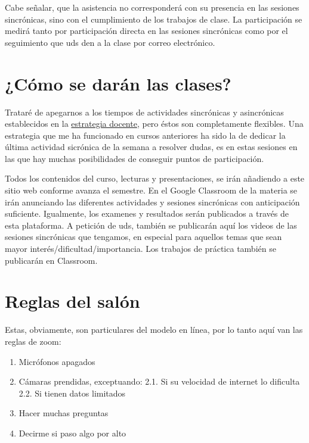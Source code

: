 \documentclass[
]{book}
\providecommand{\tightlist}{%
  \setlength{\itemsep}{0pt}\setlength{\parskip}{0pt}}
\begin{document}
Cabe señalar, que la asistencia no corresponderá con su presencia en las sesiones sincrónicas, sino con el cumplimiento de los trabajos de clase. La participación se medirá tanto por participación directa en las sesiones sincrónicas como por el seguimiento que uds den a la clase por correo electrónico.

\hypertarget{cuxf3mo-se-daruxe1n-las-clases}{%
\section{¿Cómo se darán las clases?}\label{cuxf3mo-se-daruxe1n-las-clases}}

Trataré de apegarnos a los tiempos de actividades sincrónicas y asincrónicas establecidos en la \href{Estrategia-docente.pdf}{estrategia docente}, pero éstos son completamente flexibles. Una estrategia que me ha funcionado en cursos anteriores ha sido la de dedicar la última actividad sicrónica de la semana a resolver dudas, es en estas sesiones en las que hay muchas posibilidades de conseguir puntos de participación.

Todos los contenidos del curso, lecturas y presentaciones, se irán añadiendo a este sitio web conforme avanza el semestre. En el Google Classroom de la materia se irán anunciando las diferentes actividades y sesiones sincrónicas con anticipación suficiente. Igualmente, los examenes y resultados serán publicados a través de esta plataforma. A petición de uds, también se publicarán aquí los videos de las sesiones sincrónicas que tengamos, en especial para aquellos temas que sean mayor interés/dificultad/importancia. Los trabajos de práctica también se publicarán en Classroom.

\hypertarget{reglas-del-saluxf3n}{%
\section{Reglas del salón}\label{reglas-del-saluxf3n}}

Estas, obviamente, son particulares del modelo en línea, por lo tanto aquí van las reglas de zoom:

\begin{enumerate}
\def\labelenumi{\arabic{enumi}.}
\tightlist
\item
  Micrófonos apagados
\item
  Cámaras prendidas, exceptuando:
  2.1. Si su velocidad de internet lo dificulta
  2.2. Si tienen datos limitados
\item
  Hacer muchas preguntas
\item
  Decirme si paso algo por alto
\end{enumerate}
\end{document}
